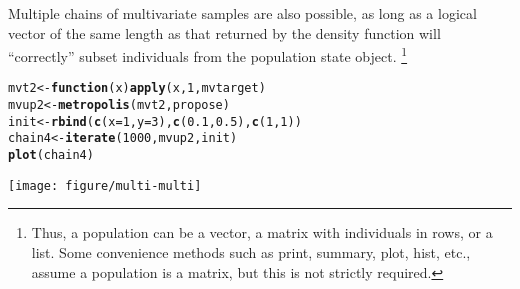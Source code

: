 \documentclass{article}\usepackage[]{graphicx}\usepackage[]{color}
\makeatletter
\def\maxwidth{ %
  \ifdim\Gin@nat@width>\linewidth
    \linewidth
  \else
    \Gin@nat@width
  \fi
}
\newcommand{\hlnum}[1]{\textcolor[rgb]{0.686,0.059,0.569}{#1}}%
\newcommand{\hlstd}[1]{\textcolor[rgb]{0.345,0.345,0.345}{#1}}%
\newcommand{\hlkwa}[1]{\textcolor[rgb]{0.161,0.373,0.58}{\textbf{#1}}}%
\newcommand{\hlkwb}[1]{\textcolor[rgb]{0.69,0.353,0.396}{#1}}%
\newcommand{\hlkwc}[1]{\textcolor[rgb]{0.333,0.667,0.333}{#1}}%
\newcommand{\hlkwd}[1]{\textcolor[rgb]{0.737,0.353,0.396}{\textbf{#1}}}%
\newenvironment{kframe}{%
 \def\at@end@of@kframe{}%
 \ifinner\ifhmode%
  \def\at@end@of@kframe{\end{minipage}}%
  \begin{minipage}{\columnwidth}%
 \fi\fi%
 \def\FrameCommand##1{\hskip\@totalleftmargin \hskip-\fboxsep
 \colorbox{shadecolor}{##1}\hskip-\fboxsep
     \hskip-\linewidth \hskip-\@totalleftmargin \hskip\columnwidth}%
 \MakeFramed {\advance\hsize-\width
   \@totalleftmargin\z@ \linewidth\hsize
   \@setminipage}}%
 {\par\unskip\endMakeFramed%
 \at@end@of@kframe}
\newenvironment{knitrout}{}{} %
\makeatother
\begin{document}
Multiple chains of multivariate samples are also possible, as long as
a logical vector of the same length as that returned by the density
function will ``correctly'' subset individuals from the population
state object. \footnote{Thus, a population can be a vector, a matrix with
individuals in rows, or a list. Some convenience methods such as
print, summary, plot, hist, etc., assume a population is a matrix, but
this is not strictly required.}
\begin{knitrout}
\color{fgcolor}\begin{kframe}
\begin{alltt}
\hlstd{mvt2} \hlkwb{<-} \hlkwa{function}\hlstd{(}\hlkwc{x}\hlstd{)} \hlkwd{apply}\hlstd{(x,} \hlnum{1}\hlstd{, mvtarget)}
\hlstd{mvup2} \hlkwb{<-} \hlkwd{metropolis}\hlstd{(mvt2, propose)}
\hlstd{init} \hlkwb{<-} \hlkwd{rbind}\hlstd{(}\hlkwd{c}\hlstd{(}\hlkwc{x} \hlstd{=} \hlnum{1}\hlstd{,} \hlkwc{y} \hlstd{=} \hlnum{3}\hlstd{),} \hlkwd{c}\hlstd{(}\hlnum{0.1}\hlstd{,} \hlnum{0.5}\hlstd{),} \hlkwd{c}\hlstd{(}\hlnum{1}\hlstd{,} \hlnum{1}\hlstd{))}
\hlstd{chain4} \hlkwb{<-} \hlkwd{iterate}\hlstd{(}\hlnum{1000}\hlstd{, mvup2, init)}
\hlkwd{plot}\hlstd{(chain4)}
\end{alltt}
\end{kframe}
\texttt{[image: figure/multi-multi]} 

\end{knitrout}
\end{document}
